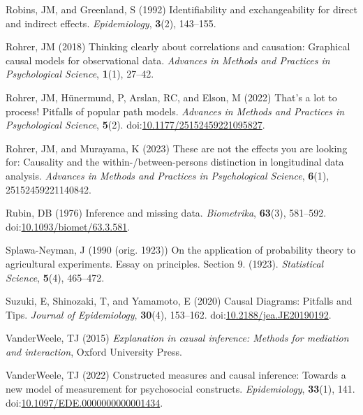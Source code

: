 \documentclass[
  singlecolumn]{article}
\newlength{\cslhangindent}
\newenvironment{CSLReferences}[2] %
 {\begin{list}{}{%
  \setlength{\itemindent}{0pt}
  \setlength{\leftmargin}{0pt}
  \setlength{\parsep}{0pt}
  \ifodd #1
   \setlength{\leftmargin}{\cslhangindent}
   \setlength{\itemindent}{-1\cslhangindent}
  \fi
  \setlength{\itemsep}{#2\baselineskip}}}
 {\end{list}}
\begin{document}
\begin{CSLReferences}{1}{0}
Robins, JM, and Greenland, S (1992) Identifiability and exchangeability
for direct and indirect effects. \emph{Epidemiology}, \textbf{3}(2),
143--155.

Rohrer, JM (2018) Thinking clearly about correlations and causation:
Graphical causal models for observational data. \emph{Advances in
Methods and Practices in Psychological Science}, \textbf{1}(1), 27--42.

Rohrer, JM, Hünermund, P, Arslan, RC, and Elson, M (2022) That's a lot
to process! Pitfalls of popular path models. \emph{Advances in Methods
and Practices in Psychological Science}, \textbf{5}(2).
doi:\href{https://doi.org/10.1177/25152459221095827}{10.1177/25152459221095827}.

Rohrer, JM, and Murayama, K (2023) These are not the effects you are
looking for: Causality and the within-/between-persons distinction in
longitudinal data analysis. \emph{Advances in Methods and Practices in
Psychological Science}, \textbf{6}(1), 25152459221140842.

Rubin, DB (1976) Inference and missing data. \emph{Biometrika},
\textbf{63}(3), 581--592.
doi:\href{https://doi.org/10.1093/biomet/63.3.581}{10.1093/biomet/63.3.581}.

Splawa-Neyman, J (1990 (orig. 1923)) On the application of probability
theory to agricultural experiments. Essay on principles. Section 9.
(1923). \emph{Statistical Science}, \textbf{5}(4), 465--472.

Suzuki, E, Shinozaki, T, and Yamamoto, E (2020) Causal Diagrams:
Pitfalls and Tips. \emph{Journal of Epidemiology}, \textbf{30}(4),
153--162.
doi:\href{https://doi.org/10.2188/jea.JE20190192}{10.2188/jea.JE20190192}.

VanderWeele, TJ (2015) \emph{Explanation in causal inference: Methods
for mediation and interaction}, Oxford University Press.

VanderWeele, TJ (2022) Constructed measures and causal inference:
Towards a new model of measurement for psychosocial constructs.
\emph{Epidemiology}, \textbf{33}(1), 141.
doi:\href{https://doi.org/10.1097/EDE.0000000000001434}{10.1097/EDE.0000000000001434}.


\end{CSLReferences}
\end{document}
